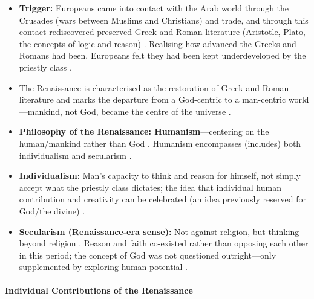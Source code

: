 \begin{KeyConcept}
\begin{itemize}
    \item \textbf{Trigger:} Europeans came into contact with the Arab world through the Crusades (wars between Muslims and Christians) and trade, and through this contact rediscovered preserved Greek and Roman literature (Aristotle, Plato, the concepts of logic and reason) . Realising how advanced the Greeks and Romans had been, Europeans felt they had been kept underdeveloped by the priestly class .
    \item The Renaissance is characterised as the restoration of Greek and Roman literature and marks the departure from a God-centric to a man-centric world---mankind, not God, became the centre of the universe .
    \item \textbf{Philosophy of the Renaissance: Humanism}---centering on the human/mankind rather than God . Humanism encompasses (includes) both individualism and secularism .
\end{itemize}
\end{KeyConcept}

\begin{KeyConcept}
\begin{itemize}
    \item \textbf{Individualism:} Man's capacity to think and reason for himself, not simply accept what the priestly class dictates; the idea that individual human contribution and creativity can be celebrated (an idea previously reserved for God/the divine) .
    \item \textbf{Secularism (Renaissance-era sense):} Not against religion, but thinking beyond religion . Reason and faith co-existed rather than opposing each other in this period; the concept of God was not questioned outright---only supplemented by exploring human potential .
\end{itemize}
\end{KeyConcept}

\paragraph{Individual Contributions of the Renaissance}


